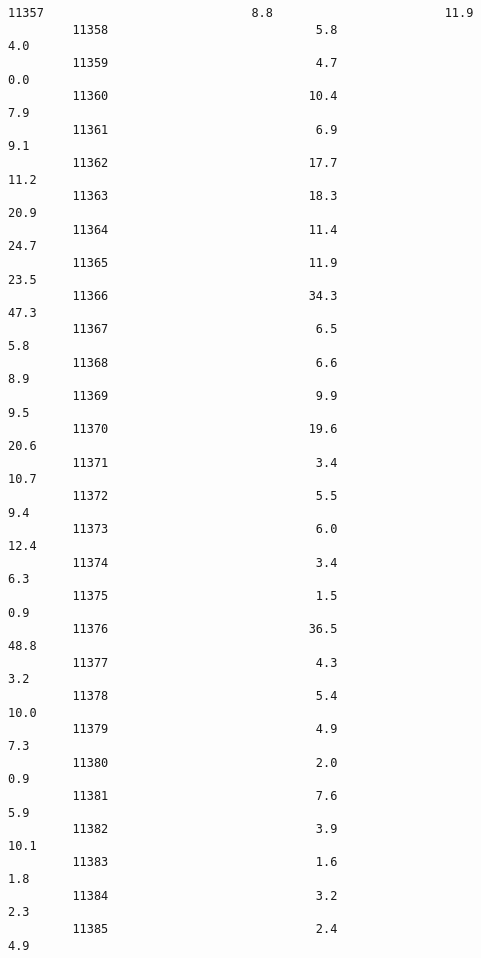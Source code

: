 \documentclass[11pt]{article}
\begin{document}
\begin{Verbatim}[commandchars=\\\{\}]
         11357                             8.8                        11.9   
         11358                             5.8                         4.0   
         11359                             4.7                         0.0   
         11360                            10.4                         7.9   
         11361                             6.9                         9.1   
         11362                            17.7                        11.2   
         11363                            18.3                        20.9   
         11364                            11.4                        24.7   
         11365                            11.9                        23.5   
         11366                            34.3                        47.3   
         11367                             6.5                         5.8   
         11368                             6.6                         8.9   
         11369                             9.9                         9.5   
         11370                            19.6                        20.6   
         11371                             3.4                        10.7   
         11372                             5.5                         9.4   
         11373                             6.0                        12.4   
         11374                             3.4                         6.3   
         11375                             1.5                         0.9   
         11376                            36.5                        48.8   
         11377                             4.3                         3.2   
         11378                             5.4                        10.0   
         11379                             4.9                         7.3   
         11380                             2.0                         0.9   
         11381                             7.6                         5.9   
         11382                             3.9                        10.1   
         11383                             1.6                         1.8   
         11384                             3.2                         2.3   
         11385                             2.4                         4.9   
         

\end{Verbatim}
\end{document}
